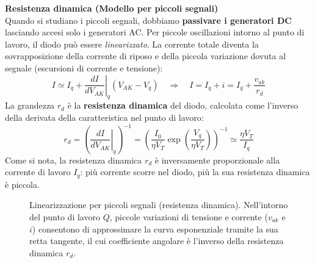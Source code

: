 \textbf{Resistenza dinamica (Modello per piccoli segnali)}\\
Quando si studiano i piccoli segnali, dobbiamo \textbf{passivare i generatori DC} lasciando accesi solo i generatori AC.
Per piccole oscillazioni intorno al punto di lavoro, il diodo può essere \textit{linearizzato}. La corrente totale diventa la sovrapposizione della corrente di riposo e della piccola variazione dovuta al segnale (escursioni di corrente e tensione):
$$ I \simeq I_q + \left. \frac{dI}{dV_{AK}} \right|_q (V_{AK} - V_q) \quad \Rightarrow \quad I = I_q + i = I_q + \frac{v_{ak}}{r_d} $$
La grandezza $r_d$ è la \textbf{resistenza dinamica} del diodo, calcolata come l'inverso della derivata della caratteristica nel punto di lavoro:
$$ r_d = \left( \left. \frac{dI}{dV_{AK}} \right|_q \right)^{-1} = \left( \frac{I_0}{\eta V_T} \exp\left(\frac{V_q}{\eta V_T}\right) \right)^{-1} \simeq \frac{\eta V_T}{I_q} $$
Come si nota, la resistenza dinamica $r_d$ è inversamente proporzionale alla corrente di lavoro $I_q$: più corrente scorre nel diodo, più la sua resistenza dinamica è piccola.

\begin{figure}[H]
    \centering
    \caption{Linearizzazione per piccoli segnali (resistenza dinamica). Nell'intorno del punto di lavoro $Q$, piccole variazioni di tensione e corrente ($v_{ak}$ e $i$) consentono di approssimare la curva esponenziale tramite la sua retta tangente, il cui coefficiente angolare è l'inverso della resistenza dinamica $r_d$.}
\end{figure}

